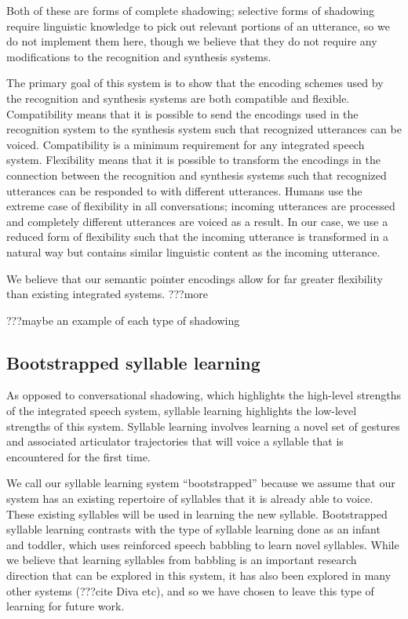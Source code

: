 Both of these are forms of complete shadowing;
selective forms of shadowing require linguistic knowledge
to pick out relevant portions of an utterance,
so we do not implement them here,
though we believe that they
do not require any modifications
to the recognition and synthesis systems.

The primary goal of this system is to show that
the encoding schemes used by
the recognition and synthesis systems
are both compatible and flexible.
Compatibility means that it is possible
to send the encodings used in the recognition system
to the synthesis system such that
recognized utterances can be voiced.
Compatibility is a minimum requirement
for any integrated speech system.
Flexibility means that it is possible
to transform the encodings
in the connection between
the recognition and synthesis systems
such that recognized utterances
can be responded to with different utterances.
Humans use the extreme case of flexibility
in all conversations;
incoming utterances are processed
and completely different utterances
are voiced as a result.
In our case, we use a reduced form
of flexibility such that the incoming utterance
is transformed in a natural way
but contains similar linguistic content
as the incoming utterance.

We believe that our semantic pointer encodings
allow for far greater flexibility
than existing integrated systems.
???more

???maybe an example of each type of shadowing

\subsection{Bootstrapped syllable learning}

As opposed to conversational shadowing,
which highlights the high-level strengths
of the integrated speech system,
syllable learning highlights
the low-level strengths of this system.
Syllable learning involves
learning a novel set of gestures
and associated articulator trajectories
that will voice a syllable
that is encountered for the first time.

We call our syllable learning system ``bootstrapped''
because we assume that our system
has an existing repertoire of syllables
that it is already able to voice.
These existing syllables will be
used in learning the new syllable.
Bootstrapped syllable learning contrasts with
the type of syllable learning
done as an infant and toddler,
which uses reinforced speech babbling
to learn novel syllables.
While we believe that learning syllables
from babbling is an important research direction
that can be explored in this system,
it has also been explored in many other systems
(???cite Diva etc),
and so we have chosen to leave this type of learning
for future work.

